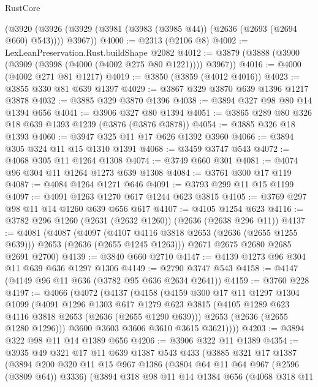 \begin{lexlean}{RustCore}
\begin{coremodule}
    (@3920 (@3926 (@3929 (@3981 (@3983 (@3985 @44)) (@2636 (@2693 (@2694 @660) @543)))) @3967))
@4000 := @2313 (@2106 @8)
@4002 := LexLeanPreservation.Rust.buildShape @2082
@4012 := @3879 (@3888 (@3900 (@3909 (@3998 (@4000 (@4002 @275 @80 @1221)))) @3967))
@4016 := @4000 (@4002 @271 @81 @1217)
@4019 := @3850 (@3859 (@4012 @4016))
@4023 := @3855 @330 @81 @639 @1397
@4029 := @3867 @329 @3870 @639 @1396 @1217 @3878
@4032 := @3885 @329 @3870 @1396
@4038 := @3894 @327 @98 @80 @14 @1394 @656
@4041 := @3906 @327 @80 @1394
@4051 := @3865 @289 @80 @326 @18 @639 @1393 @1239 (@3876 (@3876 @3878))
@4054 := @3885 @326 @18 @1393
@4060 := @3947 @325 @11 @17 @626 @1392 @3960
@4066 := @3894 @305 @324 @11 @15 @1310 @1391
@4068 := @3459 @3747 @543
@4072 := @4068 @305 @11 @1264 @1308
@4074 := @3749 @660 @301
@4081 := @4074 @96 @304 @11 @1264 @1273 @639 @1308
@4084 := @3761 @300 @17 @119
@4087 := @4084 @1264 @1271 @646
@4091 := @3793 @299 @11 @15 @1199
@4097 := @4091 @1263 @1270 @617 @1244 @623 @3815
@4105 := @3769 @297 @98 @11 @14 @1260 @639 @656 @617
@4107 := @4105 @1254 @623
@4116 := @3782 @296 @1260 (@2631 (@2632 @1260)) (@2636 (@2638 @296 @11))
@4137 := @4081
    (@4087
      (@4097 (@4107 @4116 @3818 @2653 (@2636 (@2655 @1255 @639))) @2653 (@2636 (@2655 @1245 @1263)))
      @2671
      @2675
      @2680
      @2685
      @2691
      @2700)
@4139 := @3840 @660 @2710
@4147 := @4139 @1273 @96 @304 @11 @639 @636 @1297 @1306
@4149 := @2790 @3747 @543
@4158 := @4147 (@4149 @96 @11 @636 (@3782 @95 @636 @2634 @2641))
@4159 := @3760 @228
@4197 := @4066
    (@4072
      (@4137
        (@4158
          (@4159
            @300
            @17
            @11
            @1297
            @1304
            @1099
            (@4091
              @1296
              @1303
              @617
              @1279
              @623
              @3815
              (@4105 @1289 @623 @4116 @3818 @2653 (@2636 (@2655 @1290 @639)))
              @2653
              (@2636 (@2655 @1280 @1296)))
            @3600
            @3603
            @3606
            @3610
            @3615
            @3621))))
@4203 := @3894 @322 @98 @11 @14 @1389 @656
@4206 := @3906 @322 @11 @1389
@4354 := @3935
    @49
    @321
    @17
    @11
    @639
    @1387
    @543
    @433
    (@3885
      @321
      @17
      @1387
      (@3894
        @200
        @320
        @11
        @15
        @967
        @1386
        (@3804 @64 @11 @64 @967 (@2596 (@3809 @64)) @3336)
        (@3894
          @318
          @98
          @11
          @14
          @1384
          @656
          (@4068
            @318
            @11

\end{coremodule}
\end{lexlean}
